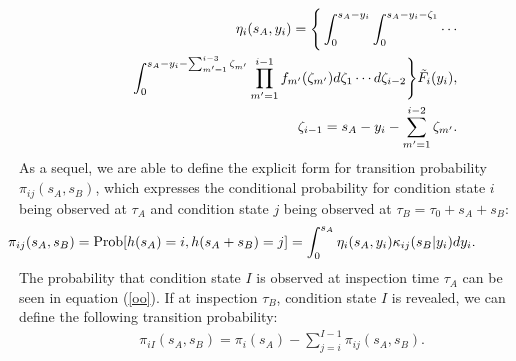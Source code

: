 \begin{eqnarray}
&& \eta_{i}(s_A,y_i)=\Bigg\{\int_0^{s_A-y_i} \int_0^{s_A-y_i-\zeta_1}\cdots \nonumber \\
&& \hspace{9mm} \int_0^{s_A-y_i-\sum_{m^\prime=1}^{i-3}\zeta_{m^\prime}}
\prod_{m^\prime=1}^{i-1} f_{m^\prime}(\zeta_{m^\prime}) 
 d\zeta_1\cdots d\zeta_{i-2}\Bigg\} \tilde{F}_i(y_i), \\
&& \zeta_{i-1}=s_A-y_i-\sum_{m^\prime=1}^{i-2}\zeta_{m^\prime}. \nonumber
\end{eqnarray}
As a sequel, we are able to define the explicit form for transition probability $\pi_{ij}(s_A,s_B)$, which expresses the conditional probability for condition state $i$ being observed at $\tau_A$ and condition state $j$ being observed at $\tau_B=\tau_0+s_A+s_B$:
\begin{eqnarray}
&& \hspace{-18mm}\pi_{ij}(s_A,s_B)=\mbox{Prob}[h(s_A)=i,h(s_A+s_B)=j] 
 =\int_{0}^{s_A}\eta_{i}(s_A,y_i)\kappa_{ij}(s_B|y_i)dy_i. \label{dousyutu3} 
\end{eqnarray}
The probability that condition state $I$ is observed at inspection time $\tau_A$ can be seen in  equation (\ref{oo}). If at inspection $\tau_B$, condition state $I$ is revealed, we can define the following transition probability:
\begin{eqnarray}
&& \pi_{iI}(s_A,s_B)=\pi_i(s_A)-\sum_{j=i}^{I-1}\pi_{ij}(s_A,s_B).\label{dousyutu4}
\end{eqnarray}
